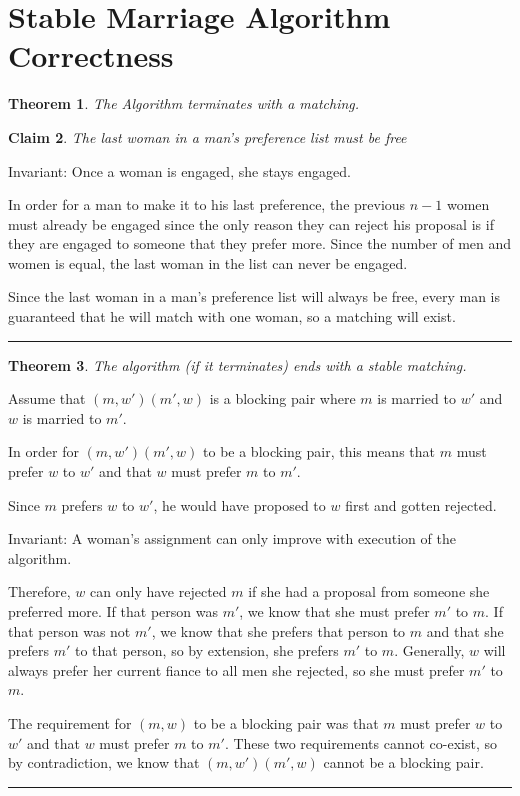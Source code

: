 \documentclass[twoside]{article}
\newcounter{lecnum}
\newtheorem{theorem}{Theorem}[lecnum]
\newtheorem{claim}[theorem]{Claim}
\newenvironment{proof}{{\bf Proof:}}{\hfill\rule{2mm}{2mm}}
\begin{document}
\section{Stable Marriage Algorithm Correctness}

\begin{theorem}
The Algorithm terminates with a matching.
\end{theorem}

\begin{proof}

\begin{claim}
The last woman in a man's preference list must be free
\end{claim}


Invariant: Once a woman is engaged, she stays engaged.

In order for a man to make it to his last preference, the previous $n-1$ women must already be engaged since the only reason they can reject his proposal is if they are engaged to someone that they prefer more. Since the number of men and women is equal, the last woman in the list can never be engaged.

Since the last woman in a man's preference list will always be free, every man is guaranteed that he will match with one woman, so a matching will exist.

\end{proof}

\begin{theorem}
The algorithm (if it terminates) ends with a stable matching.
\end{theorem}

\begin{proof}
Assume that $(m,w')(m',w)$ is a blocking pair where $m$ is married to $w'$ and $w$ is married to $m'$.

In order for $(m,w')(m',w)$ to be a blocking pair, this means that $m$ must prefer $w$ to $w'$ and that $w$ must prefer $m$ to $m'$.

Since $m$ prefers $w$ to $w'$, he would have proposed to $w$ first and gotten rejected.

Invariant: A woman's assignment can only improve with execution of the algorithm.

Therefore, $w$ can only have rejected $m$ if she had a proposal from someone she preferred more. If that person was $m'$, we know that she must prefer $m'$ to $m$. If that person was not $m'$, we know that she prefers that person to $m$ and that she prefers $m'$ to that person, so by extension, she prefers $m'$ to $m$. Generally, $w$ will always prefer her current fiance to all men she rejected, so she must prefer $m'$ to $m$. 

The requirement for $(m,w)$ to be a blocking pair was that $m$ must prefer $w$ to $w'$ and that $w$ must prefer $m$ to $m'$. These two requirements cannot co-exist, so by contradiction, we know that $(m,w')(m',w)$ cannot be a blocking pair.
\end{proof}
\end{document}
